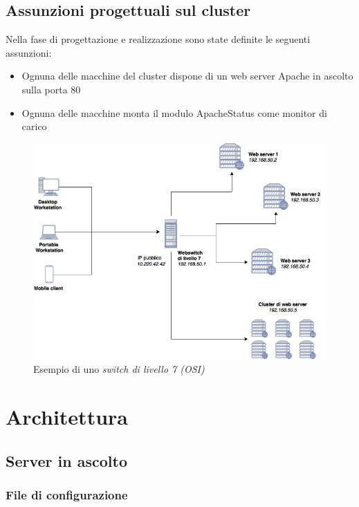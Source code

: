 \documentclass[italian]{tktltiki2}
\begin{document}
\subsection{Assunzioni progettuali sul cluster}
Nella fase di progettazione e realizzazione sono state definite le seguenti assunzioni:
\begin{itemize}
	\item Ognuna delle macchine del cluster dispone di un web server Apache in ascolto sulla porta 80
	\item Ognuna delle macchine monta il modulo ApacheStatus come monitor di carico
\end{itemize}


\begin{figure}
\centering
\includegraphics[width=\textwidth]{images/switch7}
\caption{Esempio di uno \emph{switch di livello 7 (OSI)}}
\end{figure}

\newpage
\section{Architettura}
\label{sec:architecture}


\subsection{Server in ascolto}
\label{sec:main}

\subsubsection{File di configurazione}
\label{sec:config}
\end{document}
